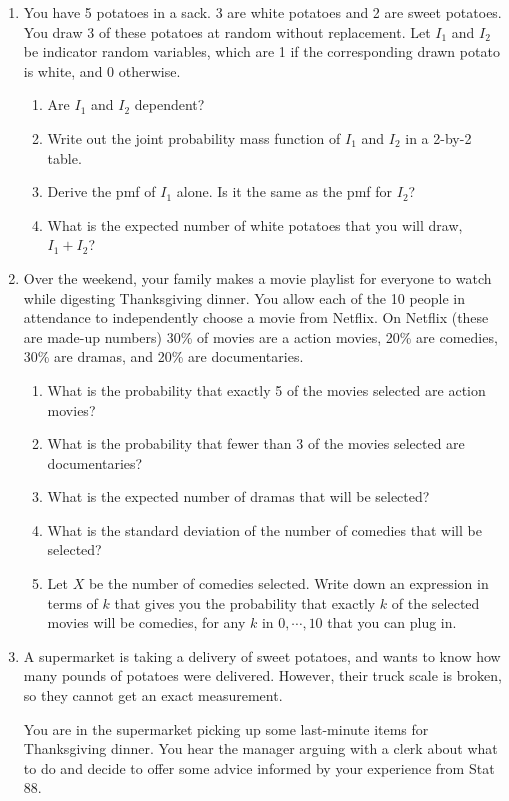 \documentclass[11pt]{article}
\begin{document}
\begin{enumerate}
\item You have 5 potatoes in a sack. 3 are white potatoes and 2 are sweet potatoes. You draw 3 of these potatoes at random without replacement. Let $I_1$ and $I_2$ be indicator random variables, which are 1 if the corresponding drawn potato is white, and 0 otherwise.
\begin{enumerate}
\item Are $I_1$ and $I_2$ dependent?
\item Write out the joint probability mass function of $I_1$ and $I_2$ in a 2-by-2 table.
\item Derive the pmf of $I_1$ alone. Is it the same as the pmf for $I_2$?
\item What is the expected number of white potatoes that you will draw, $I_1 + I_2$?
\end{enumerate}

\item Over the weekend, your family makes a movie playlist for everyone to watch while digesting Thanksgiving dinner. You allow each of the 10 people in attendance to independently choose a movie from Netflix. On Netflix (these are made-up numbers) 30\% of movies are a action movies, 20\% are comedies, 30\% are dramas, and 20\% are documentaries.

\begin{enumerate}
\item What is the probability that exactly 5 of the movies selected are action movies?
\item What is the probability that fewer than 3 of the movies selected are documentaries?
\item What is the expected number of dramas that will be selected?
\item What is the standard deviation of the number of comedies that will be selected?
\item Let $X$ be the number of comedies selected. Write down an expression in terms of $k$ that gives you the probability that exactly $k$ of the selected movies will be comedies, for any $k$ in $0, \cdots, 10$ that you can plug in.
\end{enumerate}

\item A supermarket is taking a delivery of sweet potatoes, and wants to know how many pounds of potatoes were delivered. However, their truck scale is broken, so they cannot get an exact measurement.

You are in the supermarket picking up some last-minute items for Thanksgiving dinner. You hear the manager arguing with a clerk about what to do and decide to offer some advice informed by your experience from Stat 88.


\end{enumerate}
\end{document}
